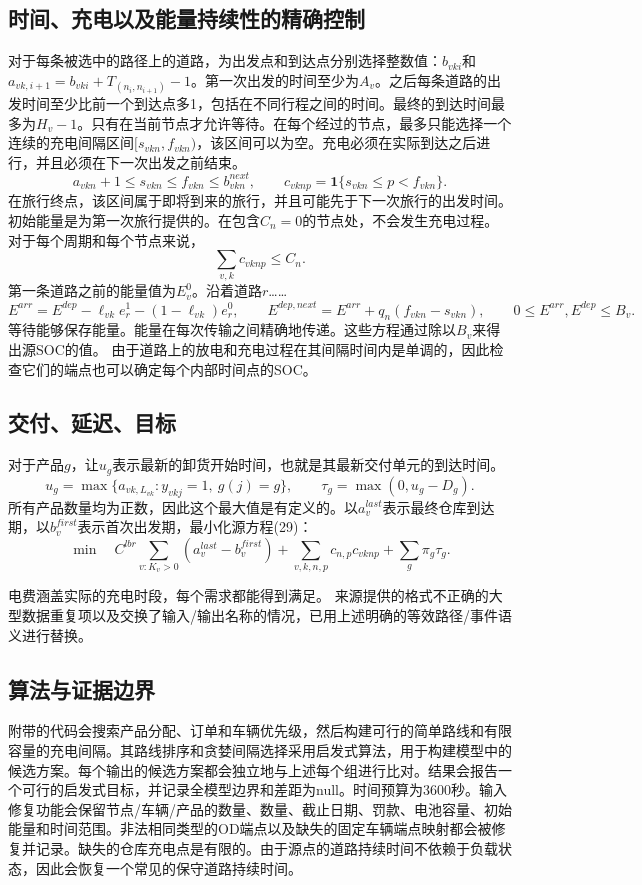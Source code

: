 \documentclass{article}
\begin{document}
\subsection*{时间、充电以及能量持续性的精确控制}
对于每条被选中的路径上的道路，为出发点和到达点分别选择整数值：$b_{vki}$和$a_{vk,i+1}=b_{vki}+T_{(n_i,n_{i+1})}-1$。第一次出发的时间至少为$A_v$。之后每条道路的出发时间至少比前一个到达点多1，包括在不同行程之间的时间。最终的到达时间最多为$H_v-1$。只有在当前节点才允许等待。在每个经过的节点，最多只能选择一个连续的充电间隔区间$[s_{vkn},f_{vkn})$，该区间可以为空。充电必须在实际到达之后进行，并且必须在下一次出发之前结束。
\[
 a_{vkn}+1\le s_{vkn}\le f_{vkn}\le b^{next}_{vkn},\qquad
 c_{vknp}=\mathbf1\{s_{vkn}\le p<f_{vkn}\}.
\]
在旅行终点，该区间属于即将到来的旅行，并且可能先于下一次旅行的出发时间。初始能量是为第一次旅行提供的。在包含$C_n=0$的节点处，不会发生充电过程。对于每个周期和每个节点来说，
\[
 \sum_{v,k}c_{vknp}\le C_n .
\]
第一条道路之前的能量值为$E_v^0$。沿着道路$r$……
\[
 E^{arr}=E^{dep}-\ell_{vk}e_r^1-(1-\ell_{vk})e_r^0,\qquad
 E^{dep,next}=E^{arr}+q_n(f_{vkn}-s_{vkn}),\qquad
 0\le E^{arr},E^{dep}\le B_v .
\]
等待能够保存能量。能量在每次传输之间精确地传递。这些方程通过除以$B_v$来得出源SOC的值。
由于道路上的放电和充电过程在其间隔时间内是单调的，因此检查它们的端点也可以确定每个内部时间点的SOC。

\subsection*{交付、延迟、目标}
对于产品$g$，让$u_g$表示最新的卸货开始时间，也就是其最新交付单元的到达时间。
\[
 u_g=\max\{a_{vk,L_{vk}}:y_{vkj}=1,\ g(j)=g\},\qquad
 \tau_g=\max(0,u_g-D_g).
\]
所有产品数量均为正数，因此这个最大值是有定义的。以$a_v^{last}$表示最终仓库到达期，以$b_v^{first}$表示首次出发期，最小化源方程(29)：
\[
 \min\quad
 C^{lbr}\sum_{v:K_v>0}(a_v^{last}-b_v^{first})
 +\sum_{v,k,n,p}c_{n,p}c_{vknp}
 +\sum_g\pi_g\tau_g .
\]

电费涵盖实际的充电时段，每个需求都能得到满足。  
来源提供的格式不正确的大型数据重复项以及交换了输入/输出名称的情况，已用上述明确的等效路径/事件语义进行替换。

\subsection*{算法与证据边界}
附带的代码会搜索产品分配、订单和车辆优先级，然后构建可行的简单路线和有限容量的充电间隔。其路线排序和贪婪间隔选择采用启发式算法，用于构建模型中的候选方案。每个输出的候选方案都会独立地与上述每个组进行比对。结果会报告一个可行的启发式目标，并记录全模型边界和差距为null。时间预算为3600秒。输入修复功能会保留节点/车辆/产品的数量、数量、截止日期、罚款、电池容量、初始能量和时间范围。非法相同类型的OD端点以及缺失的固定车辆端点映射都会被修复并记录。缺失的仓库充电点是有限的。由于源点的道路持续时间不依赖于负载状态，因此会恢复一个常见的保守道路持续时间。
\end{document}
